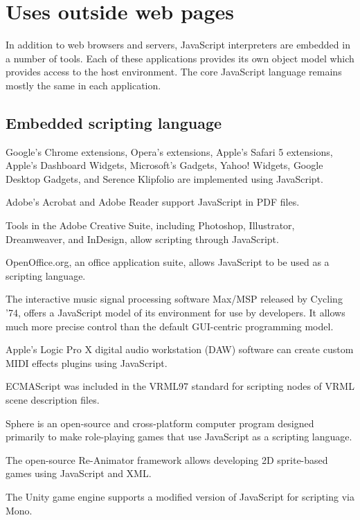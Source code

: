\chapter{Uses outside web pages}


In addition to web browsers and servers, JavaScript interpreters are embedded in a number of tools. Each of these applications provides its own object model which provides access to the host environment. The core JavaScript language remains mostly the same in each application.


\section{Embedded scripting language}

\begin{compactitem}
\item Google's Chrome extensions, Opera's extensions, Apple's Safari 5 extensions, Apple's Dashboard Widgets, Microsoft's Gadgets, Yahoo! Widgets, Google Desktop Gadgets, and Serence Klipfolio are implemented using JavaScript.
\item Adobe's Acrobat and Adobe Reader support JavaScript in PDF files.
\item Tools in the Adobe Creative Suite, including Photoshop, Illustrator, Dreamweaver, and InDesign, allow scripting through JavaScript.
\item OpenOffice.org, an office application suite, allows JavaScript to be used as a scripting language.
\item The interactive music signal processing software Max/MSP released by Cycling '74, offers a JavaScript model of its environment for use by developers. It allows much more precise control than the default GUI-centric programming model.
\item Apple's Logic Pro X digital audio workstation (DAW) software can create custom MIDI effects plugins using JavaScript.
\item ECMAScript was included in the VRML97 standard for scripting nodes of VRML scene description files.
\item Sphere is an open-source and cross-platform computer program designed primarily to make role-playing games that use JavaScript as a scripting language.
\item The open-source Re-Animator framework allows developing 2D sprite-based games using JavaScript and XML.
\item The Unity game engine supports a modified version of JavaScript for scripting via Mono.

\end{compactitem}
